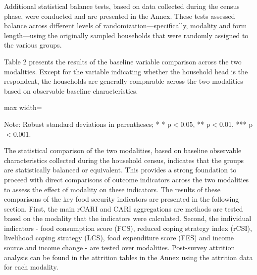 \documentclass[11pt,harvard]{article}
\begin{document}
	Additional statistical balance tests, based on data collected during the census phase, were conducted and are presented in the Annex. These tests assessed balance across different levels of randomization—specifically, modality and form length—using the originally sampled households that were randomly assigned to the various groups. 
	
	Table 2 presents the results of the baseline variable comparison across the two modalities. Except for the variable indicating whether the household head is the respondent, the households are generally comparable across the two modalities based on observable baseline characteristics.  
	
	\begin{table}[htbp]
		\centering
		\begin{adjustbox}{max width=\textwidth}
			\begin{threeparttable}
				\caption{Balance Table by Randomized Survey Modality: Face-to-Face vs. Remote for Completed Surveys}
				\small
				 
				\label{tab:BF_Completed_Demo_Balance_Modality}
				\begin{tablenotes}
					\item Note: Robust standard deviations in parentheses; * * p$<$0.05, ** p$<$0.01, *** p$<$0.001. 
				\end{tablenotes}
			\end{threeparttable}
		\end{adjustbox}
	\end{table}
	
	The statistical comparison of the two modalities, based on baseline observable characteristics collected during the household census, indicates that the groups are statistically balanced or equivalent. This provides a strong foundation to proceed with direct comparisons of outcome indicators across the two modalities to assess the effect of modality on these indicators. 
	The results of these comparisons of the key food security indicators are presented in the following section. First, the main rCARI and CARI aggregations are methods are tested based on the modality that the indicators were calculated. Second, the individual indicators - food consumption score (FCS), reduced coping strategy index (rCSI), livelihood coping strategy (LCS), food expenditure score (FES) and income source and income change - are tested over modalities. Post-survey attrition analysis can be found in the attrition tables in the Annex using the attrition data for each modality.
	
\end{document}
